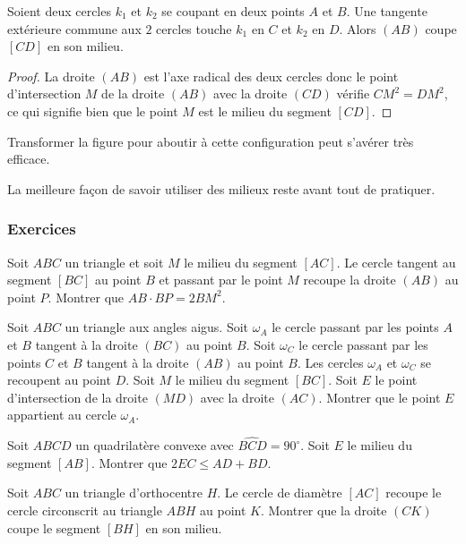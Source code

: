 \begin{lem}
Soient deux cercles $k_1$ et $k_2$ se coupant en deux points $A$ et $B$. Une tangente extérieure commune aux $2$ cercles touche $k_1$ en $C$ et $k_2$ en $D$. Alors $(AB)$ coupe $[CD]$ en son milieu.
\end{lem}


\begin{proof}
La droite $(AB)$ est l'axe radical des deux cercles donc le point d'intersection $M$ de la droite $(AB)$ avec la droite $(CD)$ vérifie $CM^2=DM^2$, ce qui signifie bien que le point $M$ est le milieu du segment $[CD]$.
\end{proof}


Transformer la figure pour aboutir à cette configuration peut s'avérer très efficace.

La meilleure façon de savoir utiliser des milieux reste avant tout de pratiquer.


\subsubsection{Exercices}


\begin{exo}
Soit $ABC$ un triangle et soit $M$ le milieu du segment $[AC]$. Le cercle tangent au segment $[BC]$ au point $B$ et passant par le point $M$ recoupe la droite $(AB)$ au point $P$. Montrer que $AB\cdot BP=2BM^2$.
\end{exo}


\begin{exo}[BXMO 2020]
Soit $ABC$ un triangle aux angles aigus. Soit $\omega_A$ le cercle passant par les points $A$ et $B$ tangent à la droite $(BC)$ au point $B$. Soit $\omega_C$ le cercle passant par les points $C$ et $B$ tangent à la droite $(AB)$ au point $B$. Les cercles $\omega_A$ et $\omega_C$ se recoupent au point $D$. Soit $M$ le milieu du segment $[BC]$. Soit $E$ le point d'intersection de la droite $(MD)$ avec la droite $(AC)$. Montrer que le point $E$ appartient au cercle $\omega_A$.
\end{exo}


\begin{exo}[Caucase MO 2018]
Soit $ABCD$ un quadrilatère convexe avec $\widehat{BCD} = 90^\circ$. Soit $E$ le milieu du segment $[AB]$. Montrer que $2EC \le AD + BD$.
\end{exo}


\begin{exo}[PAMO 2017 P6]
Soit $ABC$ un triangle d'orthocentre $H$. Le cercle de diamètre $[AC]$ recoupe le cercle circonscrit au triangle $ABH$ au point $K$. Montrer que la droite $(CK)$ coupe le segment $[BH]$ en son milieu.
\end{exo}


